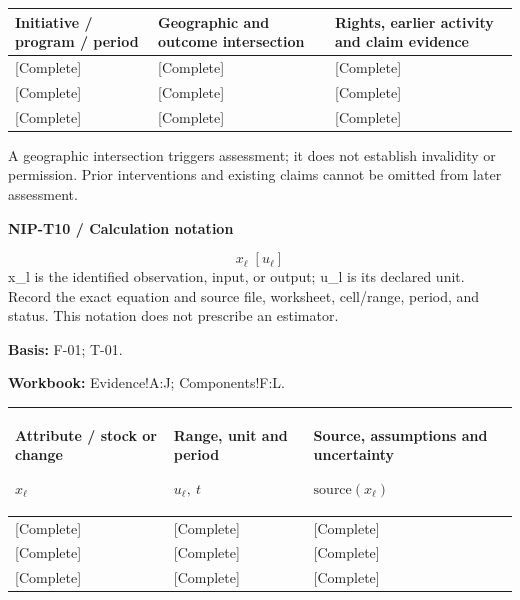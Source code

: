 {\sffamily\fontsize{8.3}{10.3}\selectfont\begin{longtable}{@{}P{46.19mm} P{56.09mm} P{62.69mm}@{}}
\toprule
\textbf{Initiative / program / period} & \textbf{Geographic and outcome intersection} & \textbf{Rights, earlier activity and claim evidence}\\\midrule\endhead
\rule{0pt}{7.7mm}[Complete] & [Complete] & [Complete]\\\hline
\rule{0pt}{7.7mm}[Complete] & [Complete] & [Complete]\\\hline
\rule{0pt}{7.7mm}[Complete] & [Complete] & [Complete]\\\hline
\end{longtable}}
\begin{Notice}A geographic intersection triggers assessment; it does not establish invalidity or permission. Prior interventions and existing claims cannot be omitted from later assessment.\end{Notice}
\par\begingroup\sffamily\fontsize{8}{10}\selectfont\color{NEBGreen}\setlength{\parskip}{2pt}\setlength{\abovedisplayskip}{4pt}\setlength{\belowdisplayskip}{4pt}\setlength{\abovedisplayshortskip}{2pt}\setlength{\belowdisplayshortskip}{3pt}
\textbf{NIP-T10 / Calculation notation}\par
{\fontsize{9}{11}\selectfont\[ x_{\ell}\;[u_{\ell}] \]}
x\_l is the identified observation, input, or output; u\_l is its declared unit. Record the exact equation and source file, worksheet, cell/range, period, and status. This notation does not prescribe an estimator.\par
\textbf{Basis:} F-01; T-01.\par
\textbf{Workbook:} Evidence!A:J; Components!F:L.\par\endgroup
{\sffamily\fontsize{8.3}{10.3}\selectfont\begin{longtable}{@{}P{51.14mm} P{46.19mm} P{67.64mm}@{}}
\toprule
\textbf{Attribute / stock or change}\par {\normalfont\fontsize{8.2}{10}\selectfont $x_{\ell}$} & \textbf{Range, unit and period}\par {\normalfont\fontsize{8.2}{10}\selectfont $u_{\ell},\ t$} & \textbf{Source, assumptions and uncertainty}\par {\normalfont\fontsize{8.2}{10}\selectfont $\text{source}(x_{\ell})$}\\\midrule\endhead
\rule{0pt}{7.7mm}[Complete] & [Complete] & [Complete]\\\hline
\rule{0pt}{7.7mm}[Complete] & [Complete] & [Complete]\\\hline
\rule{0pt}{7.7mm}[Complete] & [Complete] & [Complete]\\\hline
\end{longtable}}
